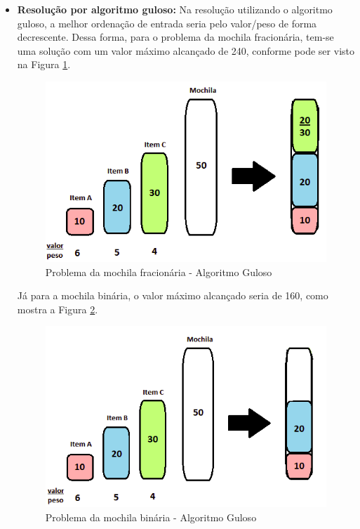\begin{itemize}
\item \textbf{Resolução por algoritmo guloso:} Na resolução utilizando o algoritmo guloso, a melhor ordenação de entrada seria pelo valor/peso de forma decrescente. Dessa forma, para o problema da mochila fracionária, tem-se uma solução com um valor máximo alcançado de 240, conforme pode ser visto na Figura \ref{mochila}.

\clearpage

\FloatBarrier
\begin{figure}[!h]
\centering
\includegraphics[keepaspectratio=true,scale=0.5]{figuras/mochila.png}
\caption{Problema da mochila fracionária - Algoritmo Guloso}
\label{mochila}
\end{figure}

Já para a mochila binária, o valor máximo alcançado seria de 160, como mostra a Figura \ref{mochilabinaria}.

\FloatBarrier
\begin{figure}[!h]
\centering
\includegraphics[keepaspectratio=true,scale=1]{figuras/mochilabinaria.png}
\caption{Problema da mochila binária - Algoritmo Guloso}
\label{mochilabinaria}
\end{figure}


\end{itemize}
